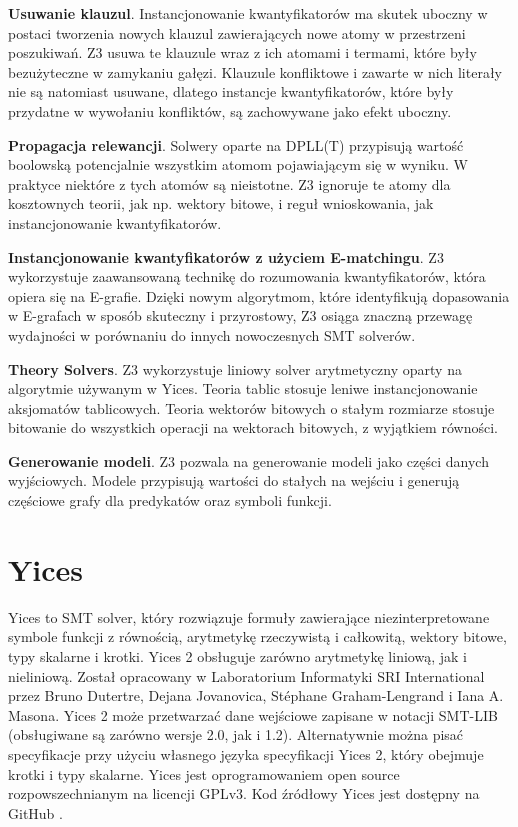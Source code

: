 \textbf{Usuwanie klauzul}. Instancjonowanie kwantyfikatorów ma skutek uboczny w postaci tworzenia nowych klauzul zawierających nowe atomy w przestrzeni poszukiwań. Z3 usuwa te klauzule wraz z ich atomami i termami, które były bezużyteczne w zamykaniu gałęzi. Klauzule konfliktowe i zawarte w nich literały nie są natomiast usuwane, dlatego instancje kwantyfikatorów, które były przydatne w wywołaniu konfliktów, są zachowywane jako efekt uboczny.

\textbf{Propagacja relewancji}. Solwery oparte na DPLL(T) przypisują wartość boolowską potencjalnie wszystkim atomom pojawiającym się w wyniku. W praktyce niektóre z tych atomów są nieistotne. Z3 ignoruje te atomy dla kosztownych teorii, jak np. wektory bitowe, i reguł wnioskowania, jak instancjonowanie kwantyfikatorów.

\textbf{Instancjonowanie kwantyfikatorów z użyciem E-matchingu}. Z3 wykorzystuje zaawansowaną technikę do rozumowania kwantyfikatorów, która opiera się na E-grafie. Dzięki nowym algorytmom, które identyfikują dopasowania w E-grafach w sposób skuteczny i przyrostowy, Z3 osiąga znaczną przewagę wydajności w porównaniu do innych nowoczesnych SMT solverów. 

\textbf{Theory Solvers}. Z3 wykorzystuje liniowy solver arytmetyczny oparty na algorytmie używanym w Yices. Teoria tablic stosuje leniwe instancjonowanie aksjomatów tablicowych. Teoria wektorów bitowych o stałym rozmiarze stosuje bitowanie do wszystkich operacji na wektorach bitowych, z wyjątkiem równości.

\textbf{Generowanie modeli}. Z3 pozwala na generowanie modeli jako części danych wyjściowych. Modele przypisują wartości do stałych na wejściu i generują częściowe grafy dla predykatów oraz symboli  funkcji.

\section{Yices}
Yices to SMT solver, który rozwiązuje formuły zawierające niezinterpretowane symbole funkcji z równością, arytmetykę rzeczywistą i całkowitą, wektory bitowe, typy skalarne i krotki. Yices 2 obsługuje zarówno arytmetykę liniową, jak i nieliniową.
Został opracowany w Laboratorium Informatyki SRI International przez Bruno Dutertre, Dejana Jovanovica, Stéphane Graham-Lengrand i Iana A. Masona.
Yices 2 może przetwarzać dane wejściowe zapisane w notacji SMT-LIB (obsługiwane są zarówno wersje 2.0, jak i 1.2). Alternatywnie można pisać specyfikacje przy użyciu własnego języka specyfikacji Yices 2, który obejmuje krotki i typy skalarne. 
Yices jest oprogramowaniem open source rozpowszechnianym na licencji GPLv3. Kod źródłowy Yices jest dostępny na GitHub \cite{yices2doc}.

